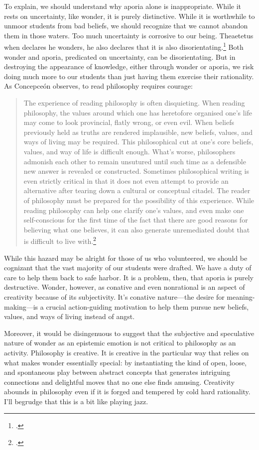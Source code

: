 \documentclass[letterpaper,notitlepage,12pt]{article}
\begin{document}
To explain, we should understand why aporia alone is inappropriate.
While it rests on uncertainty, like wonder, it is purely distinctive.
While it is worthwhile to unmoor students from bad beliefs, we should recognize
that we cannot abandon them in those waters.
Too much uncertainty is corrosive to our being.
Theaetetus when declares he wonders, he also declares that it is also
disorientating.\footcite{155d}
Both wonder and aporia, predicated on uncertainty, can be disorientating.
But in destroying the appearance of knowledge, either through wonder or aporia,
we risk doing much more to our students than just having them exercise their
rationality.
As Concepce\'on observes, to read philosophy requires courage:
\begin{quotation}
  The experience of reading philosophy is often disquieting. When reading
  philosophy, the values around which one has heretofore organised one’s life
  may come to look provincial, flatly wrong, or even evil. When beliefs
  previously held as truths are rendered implausible, new beliefs, values, and
  ways of living may be required. This philosophical cut at one’s core beliefs,
  values, and way of life is difficult enough. What’s worse, philosophers
  admonish each other to remain unsutured until such time as a defensible new
  answer is revealed or constructed. Sometimes philosophical writing is even
  strictly critical in that it does not even attempt to provide an alternative
  after tearing down a cultural or conceptual citadel. The reader of philosophy
  must be prepared for the possibility of this experience. While reading
  philosophy can help one clarify one’s values, and even make one self-conscious
  for the first time of the fact that there are good reasons for believing what
  one believes, it can also generate unremediated doubt that is difficult to
  live with.\footcite{concepcion_reading_2019}
\end{quotation}
While this hazard may be alright for those of us who volunteered, we should be
cognizant that the vast majority of our students were drafted.
We have a duty of care to help them back to safe harbor.
It is a problem, then, that aporia is purely destructive.
Wonder, however, as conative and even nonrational is an aspect of creativity
because of its subjectivity.
It's conative nature---the desire for meaning-making---is a crucial
action-guiding motivation to help them pursue new beliefs, values, and ways of
living instead of angst.

Moreover, it would be disingenuous to suggest that the subjective and
speculative nature of wonder as an epistemic emotion is not critical to
philosophy as an activity.
Philosophy is creative.
It is creative in the particular way that relies on what makes wonder
essentially special: by instantiating the kind of open, loose, and spontaneous
play between abstract concepts that generates intriguing connections and
delightful moves that no one else finds amusing.
Creativity abounds in philosophy even if it is forged and tempered by cold hard
rationality.
I'll begrudge that this is a bit like playing jazz.
\end{document}
